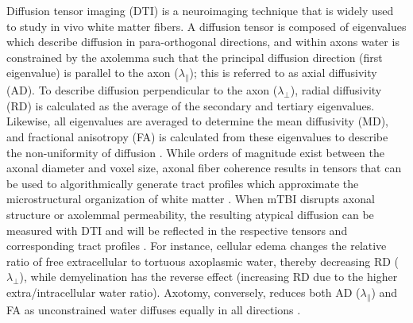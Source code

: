 \documentclass[12pt]{article}
\begin{document}
Diffusion tensor imaging (DTI) is a neuroimaging technique that is widely used to study in vivo white matter fibers. A diffusion tensor is composed of eigenvalues which describe diffusion in para-orthogonal directions, and within axons water is constrained by the axolemma such that the principal diffusion direction (first eigenvalue) is parallel to the axon ($\lambda_\parallel$); this is referred to as axial diffusivity (AD). To describe diffusion perpendicular to the axon ($\lambda_\perp$), radial diffusivity (RD) is calculated as the average of the secondary and tertiary eigenvalues. Likewise, all eigenvalues are averaged to determine the mean diffusivity (MD), and fractional anisotropy (FA) is calculated from these eigenvalues to describe the non-uniformity of diffusion \parencite{mori1999ThreedimensionalTrackingAxonal,lilja2014VisualizingMeyersLoop,lindsey2023DiffusionWeightedImagingMild}. While orders of magnitude exist between the axonal diameter and voxel size, axonal fiber coherence results in tensors that can be used to algorithmically generate tract profiles which approximate the microstructural organization of white matter \parencite{kiselev2021MicrostructureDiffusionMRI,novikov2019QuantifyingBrainMicrostructure,danielian2010ReliabilityFiberTracking,reid2022TractspecificStatisticsBased,sarwar2019MappingConnectomesDiffusion,tournier2007RobustDeterminationFibre}. When mTBI disrupts axonal structure or axolemmal permeability, the resulting atypical diffusion can be measured with DTI and will be reflected in the respective tensors and corresponding tract profiles \parencite{macdonald2007DetectionTraumaticAxonal,macdonald2007DiffusionTensorImaging}. For instance, cellular edema changes the relative ratio of free extracellular to tortuous axoplasmic water, thereby decreasing RD ($\lambda_\perp$), while demyelination has the reverse effect (increasing RD due to the higher extra/intracellular water ratio). Axotomy, conversely, reduces both AD ($\lambda_\parallel$) and FA as unconstrained water diffuses equally in all directions \parencite{rosenblum2007CytotoxicEdemaMonitoring,liang2007CytotoxicEdemaMechanisms,borja2018DiffusionMRImaging,barkhoudarian2016MolecularPathophysiologyConcussive,pettus1996CharacterizationDistinctSet}.
\end{document}
